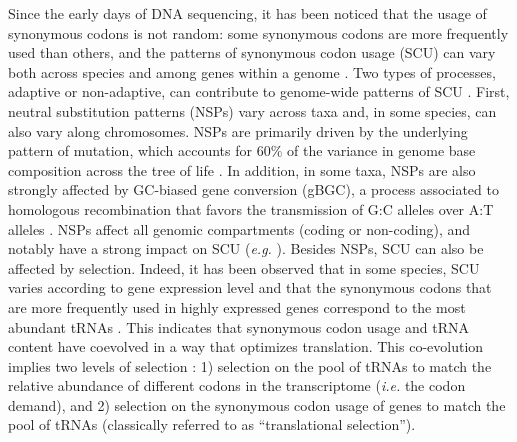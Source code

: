 Since the early days of DNA sequencing, it has been noticed that the usage of synonymous codons is not random: some synonymous codons are more frequently used than others, and the patterns of synonymous codon usage (SCU) can vary both across species and among genes within a genome \citep{grantham_codon_1980-1}. Two types of processes, adaptive or non-adaptive, can contribute to genome-wide patterns of SCU \citep{sharp_codon_1993}. First, neutral substitution patterns (NSPs) vary across taxa and, in some species, can also vary along chromosomes. NSPs are primarily driven by the underlying pattern of mutation, which accounts for 60\% of the variance in genome base composition across the tree of life \citep{long_evolutionary_2018}. In addition, in some taxa, NSPs are also strongly affected by GC-biased gene conversion (gBGC), a process associated to homologous recombination that favors the transmission of G:C alleles over A:T alleles \citep{duret_biased_2009}. NSPs affect all genomic compartments (coding or non-coding), and notably have a strong impact on SCU (\textit{e.g.} \citet{pouyet_recombination_2017, long_evolutionary_2018}). Besides NSPs, SCU can also be affected by selection. Indeed, it has been observed that in some species, SCU varies according to gene expression level \citep{gouy_codon_1982, sharp_codon_1986, duret_expression_1999} and that the synonymous codons that are more frequently used in highly expressed genes correspond to the most abundant tRNAs \citep{ikemura_codon_1985, dong_co-variation_1996, moriyama_codon_1997, kanaya_studies_1999, duret_trna_2000}. This indicates that synonymous codon usage and tRNA content have coevolved in a way that optimizes translation. This co-evolution implies two levels of selection \citep{bulmer_coevolution_1987}: 1) selection on the pool of tRNAs to match the relative abundance of different codons in the transcriptome (\textit{i.e.} the codon demand), and 2) selection on the synonymous codon usage of genes to match the pool of tRNAs (classically referred to as “translational selection”). 

